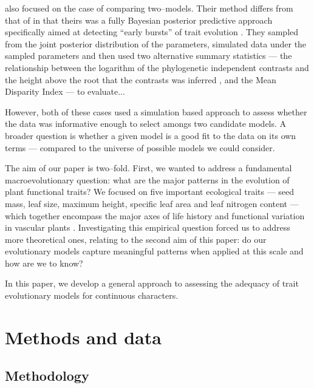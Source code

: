 \documentclass[12pt]{article}
\begin{document}
\citet{SlaterPennell} also focused on the case of comparing two--models. Their method differs from that of \citet{Boettiger2012} in that theirs was a fully Bayesian posterior predictive approach specifically aimed at detecting ``early bursts'' of trait evolution \citep[\textit{sensu}][]{Simpson1944, Simpson1953, Harmon2010}. They sampled from the joint posterior distribution of the parameters, simulated data under the sampled parameters and then used two alternative summary statistics --- the relationship between the logarithm of the phylogenetic independent contrasts and the height above the root that the contrasts was inferred \citep[a.k.a. the ``node height test'';][]{FreckletonHarvey2006}, and the Mean Disparity Index \citep[MDI;][]{Harmon2003, Slater2010} --- to evaluate...

However, both of these cases used a simulation based approach to assess whether the data was informative enough to select amongs two candidate models. A broader question is whether a given model is a good fit to the data on its own terms --- compared to the universe of possible models we could consider.

The aim of our paper is two--fold. First, we wanted to address a fundamental macroevolutionary question: what are the major patterns in the evolution of plant functional traits? We focused on five important ecological traits --- seed mass, leaf size, maximum height, specific leaf area and leaf nitrogen content \citep[the latter two being proxies for the ``leaf economic spectrum'', which characterizes the plant's hydrodynamics;][]{Reich1997, Wright2005} --- which together encompass the major axes of life history and functional variation in vascular plants \citep{Cornwell2013}. Investigating this empirical question forced us to address more theoretical ones, relating to the second aim of this paper: do our evolutionary models capture meaningful patterns when applied at this scale and how are we to know?

In this paper, we develop a general approach to assessing the adequacy of trait evolutionary models for continuous characters.

\section{Methods and data}

\subsection{Methodology}
\end{document}
